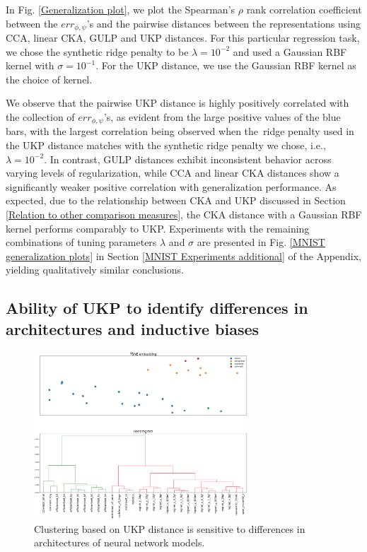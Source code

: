 \documentclass{article}
\theoremstyle{plain}
\newcommand{\repone}{\phi}
\newcommand{\reptwo}{\psi}
\newcommand{\metricstname}{UKP }
\begin{document}
In Fig. \ref{Generalization plot}, we plot the Spearman's $\rho$ rank correlation coefficient between the $err_{\repone,\reptwo}$'s and the pairwise distances between the representations using CCA, linear CKA, GULP and UKP distances. For this particular regression task, we chose the synthetic ridge penalty to be $\lambda=10^{-2}$ and used a Gaussian RBF kernel with $\sigma=10^{-1}$. For the \metricstname distance, we use the Gaussian RBF kernel as the choice of kernel.

We observe that the pairwise \metricstname distance is highly positively correlated with the collection of $err_{\repone,\reptwo}$'s, as evident from the large positive values of the blue bars, with the largest correlation being observed when the ridge penalty used in the \metricstname distance matches with the synthetic ridge penalty we chose, i.e., $\lambda=10^{-2}$. In contrast, GULP distances exhibit inconsistent behavior across varying levels of regularization, while CCA and linear CKA distances show a significantly weaker positive correlation with generalization performance. As expected, due to the relationship between CKA and \metricstname discussed in Section \ref{Relation to other comparison measures}, the CKA distance with a Gaussian RBF kernel performs comparably to UKP. 
Experiments with the remaining combinations of tuning parameters $\lambda$ and $\sigma$ are presented in Fig. \ref{MNIST generalization plots} in Section \ref{MNIST Experiments additional} of the Appendix, yielding qualitatively similar conclusions.

\subsection{Ability of \metricstname to identify differences in architectures and inductive biases} \label{ImageNet experiments experiments}

\begin{figure}[h]
\includegraphics[width=8cm]{Figures/DendogramtSNE_imagenet/DendogramandTSNE for UKP_dist_RBF_1.000000e+00_1.000000e+01.png}
\vspace{.1in}
\caption{Clustering based on \metricstname distance is sensitive to differences in architectures of neural network models.}\label{DendrogramandtSNE}
\end{figure}
\end{document}
